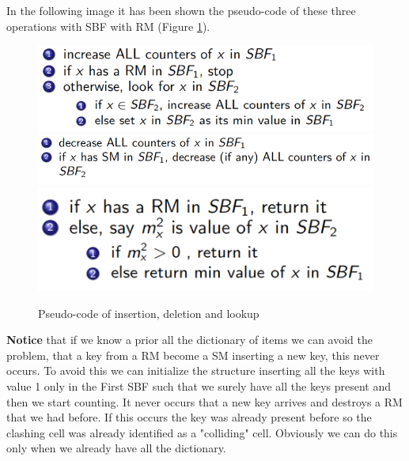 In the following image it has been shown the pseudo-code of these three operations with SBF with RM (Figure \ref{fig:insdelloo}).\newline
\begin{figure}
    \centering
    \includegraphics[width=0.75\linewidth]{images/insertion.png}
    \includegraphics[width=0.75\linewidth]{images/deletion.png}
    \includegraphics[width=0.75\linewidth]{images/lookup.png}
    \caption{Pseudo-code of insertion, deletion and lookup}
    \label{fig:insdelloo}
\end{figure}
\textbf{Notice} that if we know a prior all the dictionary of items we can avoid the problem, that a key from a RM become a SM inserting a new key, this never occurs. To avoid this we can initialize the structure inserting all the keys with value 1 only in the First SBF such that we surely have all the keys present and then we start counting. It never occurs that a new key arrives and destroys a RM that we had before. If this occurs the key was already present before so the clashing cell was already identified as a "colliding" cell. Obviously we can do this only when we already have all the dictionary.\newline
